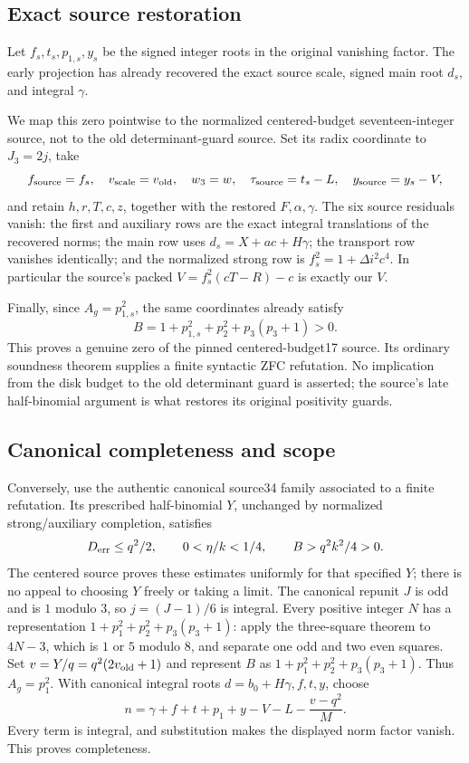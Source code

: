 \subsection{Exact source restoration}

Let $f_s,t_s,p_{1,s},y_s$ be the signed integer roots in the original
vanishing factor. The early projection has already recovered the exact
source scale, signed main root $d_s$, and integral $\gamma$.

We map this zero pointwise to the normalized centered-budget
seventeen-integer source, not to the old determinant-guard source.
Set its radix coordinate to $J_3=2j$, take
\[
 f_{\rm source}=f_s,\quad v_{\rm scale}=v_{\rm old},\quad w_3=w,
 \quad \tau_{\rm source}=t_s-L,\quad y_{\rm source}=y_s-V,
\]
and retain $h,r,T,c,z$, together with the restored $F,\alpha,\gamma$.
The six source residuals vanish: the first and auxiliary rows are the
exact integral translations of the recovered norms; the main row uses
$d_s=X+ac+H\gamma$; the transport row vanishes identically; and the
normalized strong row is $f_s^2=1+\Delta i^2c^4$.  In particular the
source's packed $V=f_s^2(cT-R)-c$ is exactly our $V$.

Finally, since $A_g=p_{1,s}^2$, the same coordinates already satisfy
\[
 B=1+p_{1,s}^2+p_2^2+p_3(p_3+1)>0.
\]
This proves a genuine zero of the pinned centered-budget17 source.
Its ordinary soundness theorem supplies a finite syntactic ZFC
refutation.  No implication from the disk budget to the old determinant
guard is asserted; the source's late half-binomial argument is what
restores its original positivity guards.

\subsection{Canonical completeness and scope}

Conversely, use the authentic canonical source34 family associated to
a finite refutation.  Its prescribed half-binomial $Y$, unchanged by
normalized strong/auxiliary completion, satisfies
\[
 D_{\rm err}\le q^2/2,\qquad 0<\eta/k<1/4,
 \qquad B>q^2k^2/4>0.
\]
The centered source proves these estimates uniformly for that specified
$Y$; there is no appeal to choosing $Y$ freely or taking a limit.
The canonical repunit $J$ is odd and is $1$ modulo $3$, so
$j=(J-1)/6$ is integral. Every positive integer $N$ has a representation
$1+p_1^2+p_2^2+p_3(p_3+1)$: apply the three-square theorem to $4N-3$,
which is $1$ or $5$ modulo $8$, and separate one odd and two even squares. Set
$v=Y/q=q^2(2v_{\rm old}+1)$ and represent $B$ as
$1+p_1^2+p_2^2+p_3(p_3+1)$.  Thus $A_g=p_1^2$.
With canonical integral roots $d=b_0+H\gamma,f,t,y$, choose
\[
 n=\gamma+f+t+p_1+y-V-L-\frac{v-q^2}{M}.
\]
Every term is integral, and substitution makes the displayed norm
factor vanish.  This proves completeness.

